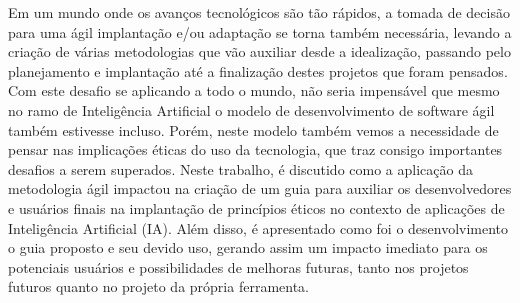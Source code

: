 Em um mundo onde os avanços tecnológicos são tão rápidos, a tomada de decisão para uma ágil implantação e/ou adaptação se torna também necessária, levando a criação de várias metodologias que vão auxiliar desde a idealização, passando pelo planejamento e implantação até a finalização destes projetos que foram pensados. Com este desafio se aplicando a todo o mundo, não seria impensável que mesmo no ramo de Inteligência Artificial o modelo de desenvolvimento de software ágil também estivesse incluso. Porém, neste modelo também vemos a necessidade de pensar nas implicações éticas do uso da tecnologia, que traz consigo importantes desafios a serem superados. Neste trabalho, é discutido como a aplicação da metodologia ágil impactou na criação de um guia para auxiliar os desenvolvedores e usuários finais na implantação de princípios éticos no contexto de aplicações de Inteligência Artificial (IA). Além disso, é apresentado como foi o desenvolvimento o guia proposto e seu devido uso, gerando assim um impacto imediato para os potenciais usuários e possibilidades de melhoras futuras, tanto nos projetos futuros quanto no projeto da própria ferramenta.


